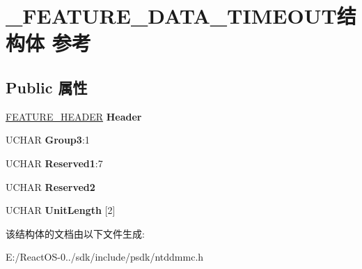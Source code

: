 \hypertarget{struct___f_e_a_t_u_r_e___d_a_t_a___t_i_m_e_o_u_t}{}\section{\+\_\+\+F\+E\+A\+T\+U\+R\+E\+\_\+\+D\+A\+T\+A\+\_\+\+T\+I\+M\+E\+O\+U\+T结构体 参考}
\label{struct___f_e_a_t_u_r_e___d_a_t_a___t_i_m_e_o_u_t}
\subsection*{Public 属性}
\begin{DoxyCompactItemize}
\item 
\mbox{\label{struct___f_e_a_t_u_r_e___d_a_t_a___t_i_m_e_o_u_t_a946a2d6e307186fd4324e0f70098e782}} 
\hyperlink{struct___f_e_a_t_u_r_e___h_e_a_d_e_r}{F\+E\+A\+T\+U\+R\+E\+\_\+\+H\+E\+A\+D\+ER} {\bfseries Header}
\item 
\mbox{\label{struct___f_e_a_t_u_r_e___d_a_t_a___t_i_m_e_o_u_t_ad033be43e3e9dfbbf963d9ff9e010f69}} 
U\+C\+H\+AR {\bfseries Group3}\+:1
\item 
\mbox{\label{struct___f_e_a_t_u_r_e___d_a_t_a___t_i_m_e_o_u_t_aca9f2007853872206a8f9805b86e0cfb}} 
U\+C\+H\+AR {\bfseries Reserved1}\+:7
\item 
\mbox{\label{struct___f_e_a_t_u_r_e___d_a_t_a___t_i_m_e_o_u_t_aa4383e9720c82ddd9572ef3cc3a5ae4c}} 
U\+C\+H\+AR {\bfseries Reserved2}
\item 
\mbox{\label{struct___f_e_a_t_u_r_e___d_a_t_a___t_i_m_e_o_u_t_ad431baeba3504a50f913690e94e8765b}} 
U\+C\+H\+AR {\bfseries Unit\+Length} \mbox{[}2\mbox{]}
\end{DoxyCompactItemize}


该结构体的文档由以下文件生成\+:\begin{DoxyCompactItemize}
\item 
E\+:/\+React\+O\+S-\/0../sdk/include/psdk/ntddmmc.\+h\end{DoxyCompactItemize}
